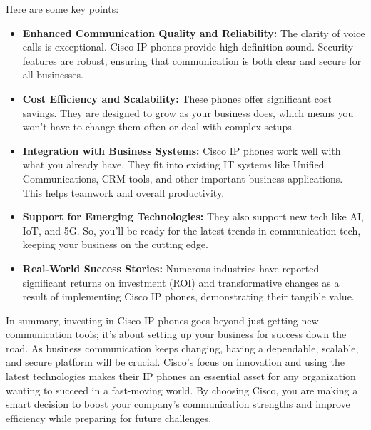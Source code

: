 \documentclass[11pt,a4paper]{article}
\begin{document}
Here are some key points:

\begin{itemize}
    \item \textbf{Enhanced Communication Quality and Reliability:} The clarity of voice calls is exceptional. Cisco IP phones provide high-definition sound. Security features are robust, ensuring that communication is both clear and secure for all businesses.
    \item \textbf{Cost Efficiency and Scalability:} These phones offer significant cost savings. They are designed to grow as your business does, which means you won’t have to change them often or deal with complex setups.
    \item \textbf{Integration with Business Systems:} Cisco IP phones work well with what you already have. They fit into existing IT systems like Unified Communications, CRM tools, and other important business applications. This helps teamwork and overall productivity.
    \item \textbf{Support for Emerging Technologies:} They also support new tech like AI, IoT, and 5G. So, you’ll be ready for the latest trends in communication tech, keeping your business on the cutting edge.
    \item \textbf{Real-World Success Stories:} Numerous industries have reported significant returns on investment (ROI) and transformative changes as a result of implementing Cisco IP phones, demonstrating their tangible value.
\end{itemize}

In summary, investing in Cisco IP phones goes beyond just getting new communication tools; it’s about setting up your business for success down the road. As business communication keeps changing, having a dependable, scalable, and secure platform will be crucial. Cisco's focus on innovation and using the latest technologies makes their IP phones an essential asset for any organization wanting to succeed in a fast-moving world. By choosing Cisco, you are making a smart decision to boost your company’s communication strengths and improve efficiency while preparing for future challenges.


\newpage

\begin{multicols}{2}
  \small
  
  \makeatletter
\renewcommand\@biblabel[1]{#1.} 
  
 
  \end{multicols}
\end{document}
